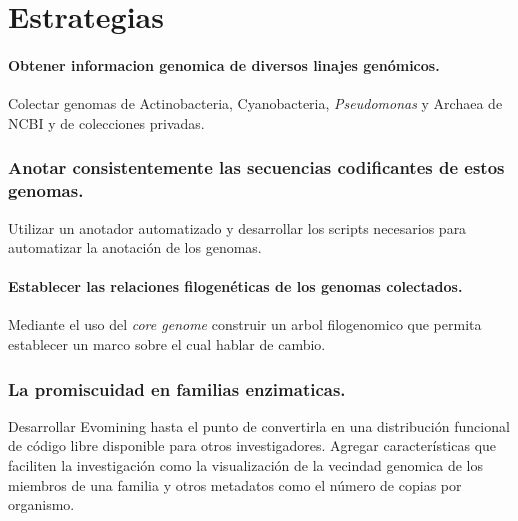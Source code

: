 \documentclass[12pt,twoside]{reedthesis}
\begin{document}
  \clearpage  
  
  \chapter*{Estrategias}\label{estrategias}
  
  \subsubsection{Obtener informacion genomica de diversos linajes
  genómicos.}\label{obtener-informacion-genomica-de-diversos-linajes-genomicos.}
  
  Colectar genomas de Actinobacteria, Cyanobacteria, \emph{Pseudomonas} y
  Archaea de NCBI y de colecciones privadas.
  
  \subsection{Anotar consistentemente las secuencias codificantes de estos
  genomas.}\label{anotar-consistentemente-las-secuencias-codificantes-de-estos-genomas.}
  
  Utilizar un anotador automatizado y desarrollar los scripts necesarios
  para automatizar la anotación de los genomas.
  
  \subsubsection{Establecer las relaciones filogenéticas de los genomas
  colectados.}\label{establecer-las-relaciones-filogeneticas-de-los-genomas-colectados.}
  
  Mediante el uso del \emph{core genome} construir un arbol filogenomico
  que permita establecer un marco sobre el cual hablar de cambio.
  
  \subsection{La promiscuidad en familias
  enzimaticas.}\label{la-promiscuidad-en-familias-enzimaticas.}
  
  Desarrollar Evomining hasta el punto de convertirla en una distribución
  funcional de código libre disponible para otros investigadores. Agregar
  características que faciliten la investigación como la visualización de
  la vecindad genomica de los miembros de una familia y otros metadatos
  como el número de copias por organismo.
  
\end{document}
